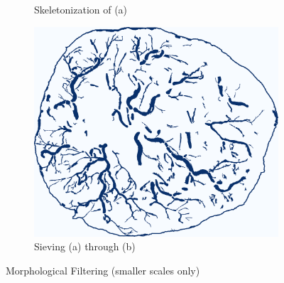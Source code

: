\documentclass[9pt]{beamer}
\begin{document}
\begin{frame}
\begin{figure}
\begin{subfigure}[b]{0.30\textwidth}
			\caption{Skeletonization of (a)}
		\end{subfigure}
		\begin{subfigure}[b]{0.30\textwidth}
			\includegraphics[width=\textwidth]{G-on_skel}
			\caption{Sieving (a) through (b)}
		\end{subfigure}
		\caption{Morphological Filtering (smaller scales only)}
	\end{figure}
\end{frame}
\end{document}

